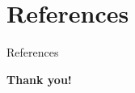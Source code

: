 \documentclass[aspectratio=169,xcolor=dvipsnames]{beamer}
\begin{document}
\section{References}
\begin{frame}[allowframebreaks]{References}
    \small
    \printbibliography
\end{frame}


\begin{frame}[plain]
  \centering
  \Huge \textbf{Thank you!}
\end{frame}
\end{document}
